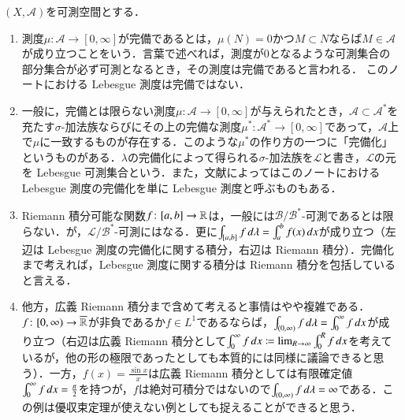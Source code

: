 \begin{que}$(X,\mathcal{A})$を可測空間とする．
\begin{enumerate}
\item 測度$\mu \colon \mathcal{A} \to [0,\infty]$が完備であるとは，$\mu(N)=0$かつ$M \subset N$ならば$M \in \mathcal{A}$が成り立つことをいう．言葉で述べれば，測度が0となるような可測集合の部分集合が必ず可測となるとき，その測度は完備であると言われる． このノートにおける Lebesgue 測度は完備ではない．
\item 一般に，完備とは限らない測度$\mu \colon \mathcal{A} \to [0,\infty]$が与えられたとき，$\mathcal{A} \subset \mathcal{A}^*$を充たす$\sigma$-加法族ならびにその上の完備な測度$\mu^* \colon \mathcal{A}^* \to [0,\infty]$であって，$\mathcal{A}$上で$\mu$に一致するものが存在する．このような$\mu^*$の作り方の一つに「完備化」というものがある．$\lambda$の完備化によって得られる$\sigma$-加法族を$\mathcal{L}$と書き，$\mathcal{L}$の元を Lebesgue 可測集合という．また，文献によってはこのノートにおける Lebesgue 測度の完備化を単に Lebesgue 測度と呼ぶものもある．
\item Riemann 積分可能な関数$f \colon [a,b] \to \mathbb{R}$は，一般には$\mathcal{B}/\mathcal{B}^*$-可測であるとは限らない．が，$\mathcal{L}/\mathcal{B}^*$-可測にはなる．更に$\int_{[a,b]} f \mathop{}\!d \lambda = \int_a^b f(x) \mathop{}\!d x$が成り立つ（左辺は Lebesgue 測度の完備化に関する積分，右辺は Riemann 積分）．完備化まで考えれば，Lebesgue 測度に関する積分は Riemann 積分を包括していると言える．
\item 他方，広義 Riemann 積分まで含めて考えると事情はやや複雑である．$f \colon [0,\infty) \to \overline{\mathbb{R}}$が非負であるか$f \in L^1$であるならば，$\int_{(0,\infty)} f \mathop{}\!d \lambda = \int_{0}^\infty f \mathop{}\!d x$が成り立つ（右辺は広義 Riemann 積分として$\int_0^\infty f \mathop{}\!d x \coloneqq \lim_{R \to \infty} \int_0^R f \mathop{}\!d x$を考えているが，他の形の極限であったとしても本質的には同様に議論できると思う）．一方，$f(x) = \frac{\sin x}{x}$は広義 Riemann 積分としては有限確定値$\int_0^\infty f \mathop{}\!d x = \frac{\pi}{2}$を持つが，$f$は絶対可積分ではないので$\int_{(0,\infty)} f \mathop{}\!d \lambda = \infty$である．この例は優収束定理が使えない例としても捉えることができると思う．
\end{enumerate}
\end{que}

